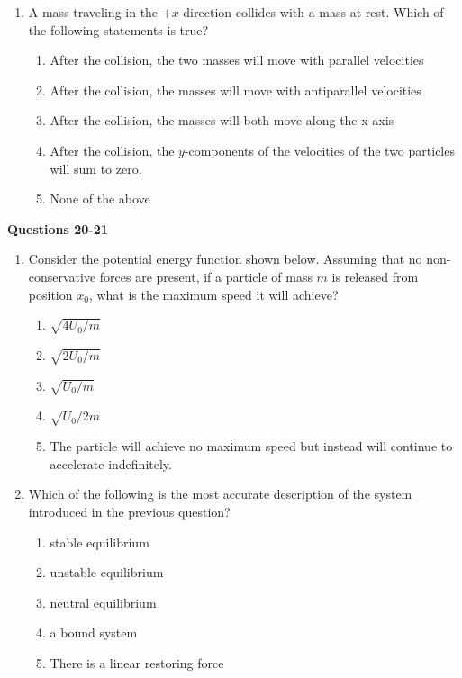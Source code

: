 \documentclass{../../oss-apphys}
\begin{document}
\begin{multicols}{2}
\begin{enumerate}[resume,leftmargin=18pt]
  \item A mass traveling in the $+x$ direction collides with a mass at rest.
    Which of the following statements is true?
    \begin{enumerate}[noitemsep,topsep=0pt,leftmargin=18pt,label=(\Alph*)]
    \item After the collision, the two masses will move with parallel velocities
    \item After the collision, the masses will move with antiparallel velocities
    \item After the collision, the masses will both move along the x-axis
    \item After the collision, the $y$-components of the velocities of the two
      particles will sum to zero.
    \item None of the above
    \end{enumerate}
  \end{enumerate}
  \columnbreak
  
  \textbf{Questions 20-21}

  \begin{enumerate}[resume,leftmargin=18pt]
  \item Consider the potential energy function shown below. Assuming that no
    non-conservative forces are present, if a particle of mass $m$ is released
    from position $x_0$, what is the maximum speed it will achieve?
    \begin{center}
    \end{center}
    \begin{enumerate}[noitemsep,topsep=0pt,leftmargin=18pt,label=(\Alph*)]
    \item $\sqrt{4U_0/m}$
    \item $\sqrt{2U_0/m}$
    \item $\sqrt{U_0/m}$
    \item $\sqrt{U_0/2m}$
    \item The particle will achieve no maximum speed but instead will continue
      to accelerate indefinitely.
    \end{enumerate}

  \item Which of the following is the most accurate description of the system
    introduced in the previous question?
    \begin{enumerate}[noitemsep,topsep=0pt,leftmargin=18pt,label=(\Alph*)]
    \item stable equilibrium
    \item unstable equilibrium
    \item neutral equilibrium
    \item a bound system
    \item There is a linear restoring force
    \end{enumerate}
    

\end{enumerate}
\end{multicols}
\end{document}
